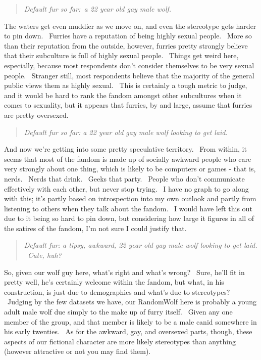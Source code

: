 \begin{quote}
\emph{Default fur so far:~a 22 year old gay male wolf.}
\end{quote}

The waters get even muddier as we move on, and even the stereotype gets
harder to pin down. ~Furries have a reputation of being highly sexual
people. ~More so than their reputation from the outside, however,
furries pretty strongly believe that their subculture is full of highly
sexual people. ~Things get weird here, especially, because most
respondents don't consider themselves to be very sexual people.
~Stranger still, most respondents believe that the majority of the
general public views them as highly sexual. ~This is certainly a tough
metric to judge, and it would be hard to rank the fandom amongst other
subcultures when it comes to sexuality, but it appears that furries, by
and large, assume that furries are pretty oversexed.

\begin{quote}
\emph{Default fur so far: a 22 year old gay male wolf looking to get
laid.}
\end{quote}

And now we're getting into some pretty speculative territory. ~From
within, it seems that most of the fandom is made up of socially awkward
people who care very strongly about one thing, which is likely to be
computers or games - that is, nerds. ~Nerds that drink. ~Geeks that
party. ~People who don't communicate effectively with each other, but
never stop trying. ~I have no graph to go along with this; it's partly
based on introspection into my own outlook and partly from listening to
others when they talk about the fandom. ~I would have left this out due
to it being so hard to pin down, but considering how large it figures in
all of the satires of the fandom, I'm not sure I could justify that.

\begin{quote}
\emph{Default fur: a tipsy, awkward, 22 year old gay male wolf looking
to get laid. ~Cute, huh?}
\end{quote}

So, given our wolf guy here, what's right and what's wrong? ~Sure, he'll
fit in pretty well, he's certainly welcome within the fandom, but what,
in his construction, is just due to demographics and what's due to
stereotypes? ~Judging by the few datasets we have, our RandomWolf here
is probably a young adult male wolf due simply to the make up of furry
itself. ~Given any one member of the group, and that member is likely to
be a male canid somewhere in his early twenties. ~As for the awkward,
gay, and oversexed parts, though, these aspects of our fictional
character are more likely stereotypes than anything (however attractive
or not you may find them).

